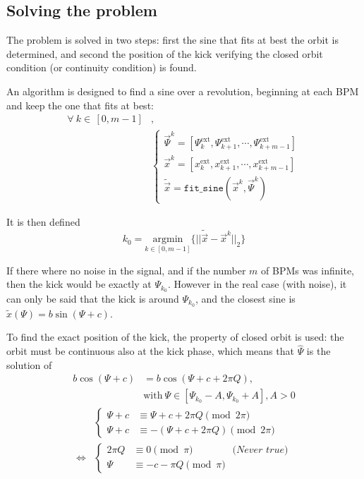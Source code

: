 \subsection{Solving the problem}

The problem is solved in two steps: first the sine that fits at best the orbit is determined, and second the position of the kick verifying the closed orbit condition (or continuity condition) is found.

An algorithm is designed to find a sine over a revolution, beginning at each BPM and keep the one that fits at best:
\begin{align}
\forall~k \in \, [0,m-1]&, \nonumber \\
&\begin{cases}
\vec{\Psi}^k = \left[\Psi^\mathrm{ext}_{k}, \Psi^\mathrm{ext}_{k+1}, \cdots,  \Psi^\mathrm{ext}_{k+m-1}\right]\\
\vec{x}^k = \left[x^\mathrm{ext}_{k}, x^\mathrm{ext}_{k+1}, \cdots,  x^\mathrm{ext}_{k+m-1}\right]\\
\tilde{\vec{x}} = \mathtt{fit\_sine}\left(\vec{x}^k, \vec{\Psi}^k\right)
\end{cases}
\end{align}

It is then defined
\begin{equation}
k_0 = \underset{k \in [0, m-1]}{\textrm{argmin}}\{||\tilde{\vec{x}}-\vec{x}^k||_2\}
\end{equation}

If there where no noise in the signal, and if the number $m$ of BPMs was infinite, then the kick would be exactly at $\Psi_{k_0}$. However in the real case (with noise), it can only be said that the kick is around $\Psi_{k_0}$, and the closest sine is $\tilde{x}(\Psi) = b \sin(\Psi + c)$.

To find the exact position of the kick, the property of closed orbit is used: the orbit must be continuous also at the kick phase, which means that $\hat{\Psi}$ is the solution of
\begin{align}
b \cos(\Psi + c) &= b\cos(\Psi+c+2 \pi Q),\\
& \mathrm{with}~ \Psi \in [\Psi_{k_0}-A, \Psi_{k_0}+A] , A>0 \nonumber
\end{align}
\begin{align}
&\begin{cases}
\Psi + c &\equiv \Psi + c + 2 \pi Q \pmod{2 \pi} \\
\Psi + c &\equiv - (\Psi + c + 2 \pi Q) \pmod{2 \pi}
\end{cases} \nonumber\\
\iff &\begin{cases}
2 \pi Q &\equiv 0\pmod \pi \qquad\qquad\textit{(Never true)}\\
\Psi &\equiv -c - \pi Q  \pmod \pi
\end{cases} \nonumber
\end{align}

